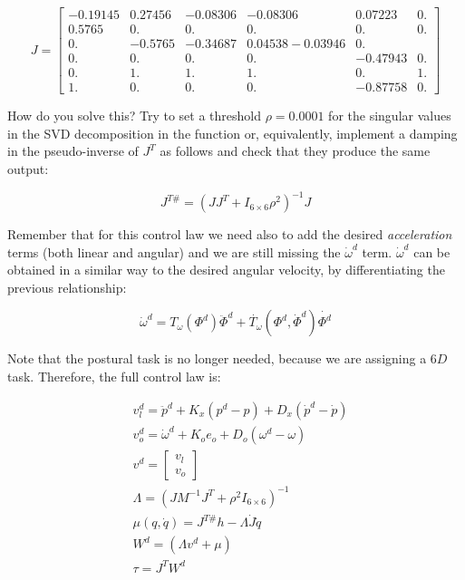 \documentclass[11pt]{article}
\newcommand{\mat}[1]{\ensuremath{\begin{bmatrix}#1\end{bmatrix}}}	%
\begin{document}
 \begin{equation}
  J = \mat{-0.19145 &0.27456& -0.08306 &-0.08306 & 0.07223 & 0. \\    
  0.5765&   0.    &   0.  &     0.   &    0.  &     0.     \\
  0.    &  -0.5765 & -0.34687&  0.04538 -0.03946  &0.     \\
  0.  &     0.  &     0.    &   0. &     -0.47943 & 0.     \\
  0.  &     1.  &     1.    &   1.  &     0.      & 1.     \\
  1.  &     0.  &     0.    &   0.&      -0.87758 & 0.     }
 \end{equation}

How do you solve this? Try to set a threshold $\rho = 0.0001$ for the singular values in the 
SVD decomposition in the  function or, equivalently, implement  a damping in the pseudo-inverse of $J^T$ as follows and check that they produce the same output: 

\begin{equation}
J^{T\#} = \left(J J^T + I_{6\times 6}\rho^2\right)^{-1}J
\end{equation} 

Remember that for this control law we need also to add the desired \textit{acceleration} terms (both linear and angular) and we are still missing the $\dot{\omega}^d$ term. $\dot{\omega}^d$ can be obtained in a similar way to the desired angular velocity, by differentiating the previous relationship:

\begin{equation}
\dot{\omega}^d = T_{\omega}(\Phi^d) \ddot{\Phi}^d +  \dot{T_{\omega}}(\Phi^d,\dot{\Phi}^d ) \dot{\Phi^d}
\end{equation}

Note that the postural task is no longer needed, because we are assigning a $6D$ task. Therefore, the full control law is:
 
\begin{align}
& v_l^d = \ddot{p}^d + K_x(p^d - p) + D_x(\dot{p}^d -\dot{p})  \\
& v_o^d  = \dot{\omega}^d + K_{o} e_o  + D_o(\omega^d - \omega)  \\
& v^d = \mat{v_l \\ v_o} \\
& \Lambda = (J M^{-1}J^T + \rho^2 I_{6 \times6})^{-1}\\
&\mu(q,\dot{q})  = J^{T\#} h -\Lambda \dot{J} \dot{q} \\
& W^d = \left( \Lambda v^d + \mu \right)\\
& \tau = J^TW^d 
\end{align} 
\end{document}
